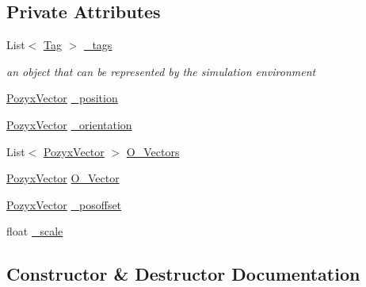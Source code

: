 \subsection*{Private Attributes}
\begin{DoxyCompactItemize}
\item 
List$<$ \hyperlink{class_pozyx_positioner_1_1_framework_1_1_tag}{Tag} $>$ \hyperlink{class_pozyx_positioner_1_1_framework_1_1_sim_object_aa84e7c3fd9b8c17e15e4ba64b0e5867b}{\+\_\+tags}
\begin{DoxyCompactList}\small\item\em an object that can be represented by the simulation environment \end{DoxyCompactList}\item 
\hyperlink{struct_pozyx_positioner_1_1_framework_1_1_pozyx_vector}{Pozyx\+Vector} \hyperlink{class_pozyx_positioner_1_1_framework_1_1_sim_object_a2955942c0f03c9dfadcc5bb13127116b}{\+\_\+position}
\item 
\hyperlink{struct_pozyx_positioner_1_1_framework_1_1_pozyx_vector}{Pozyx\+Vector} \hyperlink{class_pozyx_positioner_1_1_framework_1_1_sim_object_a20cac81c32c0b711c923aae1c6c8352c}{\+\_\+orientation}
\item 
List$<$ \hyperlink{struct_pozyx_positioner_1_1_framework_1_1_pozyx_vector}{Pozyx\+Vector} $>$ \hyperlink{class_pozyx_positioner_1_1_framework_1_1_sim_object_a83028e56f420485333ba365bd5949550}{O\+\_\+\+Vectors}
\item 
\hyperlink{struct_pozyx_positioner_1_1_framework_1_1_pozyx_vector}{Pozyx\+Vector} \hyperlink{class_pozyx_positioner_1_1_framework_1_1_sim_object_a9f70129956e360ff10ebe252d924a536}{O\+\_\+\+Vector}
\item 
\hyperlink{struct_pozyx_positioner_1_1_framework_1_1_pozyx_vector}{Pozyx\+Vector} \hyperlink{class_pozyx_positioner_1_1_framework_1_1_sim_object_a27df1659477df50c36d6b0fff1b58786}{\+\_\+posoffset}
\item 
float \hyperlink{class_pozyx_positioner_1_1_framework_1_1_sim_object_af8b6718a875d6056b22624ea9cb6e0c9}{\+\_\+scale}
\end{DoxyCompactItemize}


\subsection{Constructor \& Destructor Documentation}
\mbox{\label{class_pozyx_positioner_1_1_framework_1_1_sim_object_acc186255ccf8c50a2de3aeaf8e65f645}} 
